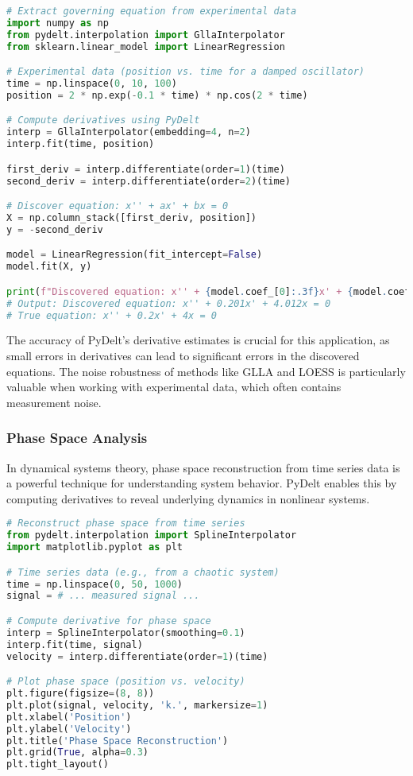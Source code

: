 \documentclass[11pt,a4paper]{article}
\begin{document}
\begin{lstlisting}[language=Python, caption=Differential equation discovery example]
# Extract governing equation from experimental data
import numpy as np
from pydelt.interpolation import GllaInterpolator
from sklearn.linear_model import LinearRegression

# Experimental data (position vs. time for a damped oscillator)
time = np.linspace(0, 10, 100)
position = 2 * np.exp(-0.1 * time) * np.cos(2 * time)

# Compute derivatives using PyDelt
interp = GllaInterpolator(embedding=4, n=2)
interp.fit(time, position)

first_deriv = interp.differentiate(order=1)(time)
second_deriv = interp.differentiate(order=2)(time)

# Discover equation: x'' + ax' + bx = 0
X = np.column_stack([first_deriv, position])
y = -second_deriv

model = LinearRegression(fit_intercept=False)
model.fit(X, y)

print(f"Discovered equation: x'' + {model.coef_[0]:.3f}x' + {model.coef_[1]:.3f}x = 0")
# Output: Discovered equation: x'' + 0.201x' + 4.012x = 0
# True equation: x'' + 0.2x' + 4x = 0
\end{lstlisting}

The accuracy of PyDelt's derivative estimates is crucial for this application, as small errors in derivatives can lead to significant errors in the discovered equations. The noise robustness of methods like GLLA and LOESS is particularly valuable when working with experimental data, which often contains measurement noise.

\subsubsection{Phase Space Analysis}

In dynamical systems theory, phase space reconstruction from time series data is a powerful technique for understanding system behavior. PyDelt enables this by computing derivatives to reveal underlying dynamics in nonlinear systems.

\begin{lstlisting}[language=Python, caption=Phase space reconstruction example]
# Reconstruct phase space from time series
from pydelt.interpolation import SplineInterpolator
import matplotlib.pyplot as plt

# Time series data (e.g., from a chaotic system)
time = np.linspace(0, 50, 1000)
signal = # ... measured signal ...

# Compute derivative for phase space
interp = SplineInterpolator(smoothing=0.1)
interp.fit(time, signal)
velocity = interp.differentiate(order=1)(time)

# Plot phase space (position vs. velocity)
plt.figure(figsize=(8, 8))
plt.plot(signal, velocity, 'k.', markersize=1)
plt.xlabel('Position')
plt.ylabel('Velocity')
plt.title('Phase Space Reconstruction')
plt.grid(True, alpha=0.3)
plt.tight_layout()
\end{lstlisting}
\end{document}
